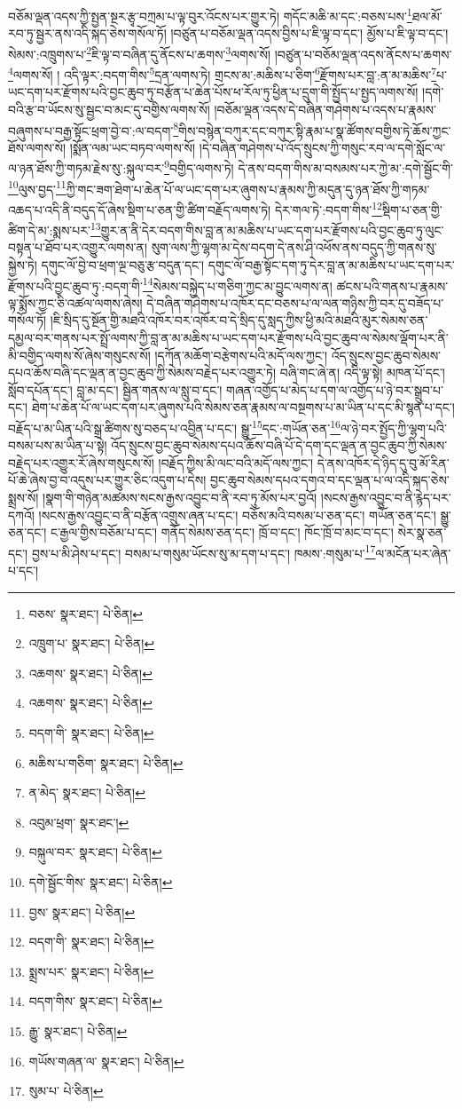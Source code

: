 བཅོམ་ལྡན་འདས་ཀྱི་སྤྱན་སྔར་རྩྭ་བཀྲམ་པ་ལྟ་བུར་འོངས་པར་གྱུར་ཏེ། གདོང་མཆི་མ་དང་:བཅས་པས་\footnote{བཅས་  སྣར་ཐང་།  པེ་ཅིན། }ཐལ་མོ་རབ་ཏུ་སྦྱར་ནས་འདི་སྐད་ཅེས་གསོལ་ཏོ། །བཙུན་པ་བཅོམ་ལྡན་འདས་བྱིས་པ་ཇི་ལྟ་བ་དང་། མྱོས་པ་ཇི་ལྟ་བ་དང་། སེམས་:འཁྲུགས་པ་\footnote{འཁྲུག་པ་  སྣར་ཐང་།  པེ་ཅིན། }ཇི་ལྟ་བ་བཞིན་དུ་ནོངས་པ་ཆགས་\footnote{འཆགས་  སྣར་ཐང་།  པེ་ཅིན། }ལགས་སོ། །བཙུན་པ་བཅོམ་ལྡན་འདས་ནོངས་པ་ཆགས་\footnote{འཆགས་  སྣར་ཐང་།  པེ་ཅིན། }ལགས་སོ། །
འདི་ལྟར་:བདག་གིས་\footnote{བདག་གི་  སྣར་ཐང་།  པེ་ཅིན། }དྲན་ལགས་ཏེ། གྲངས་མ་:མཆིས་པ་ཅིག་\footnote{མཆིས་པ་གཅིག་  སྣར་ཐང་།  པེ་ཅིན། }རྫོགས་པར་བླ་:ན་མ་མཆིས་\footnote{ན་མེད་  སྣར་ཐང་།  པེ་ཅིན། }པ་ཡང་དག་པར་རྫོགས་པའི་བྱང་ཆུབ་ཏུ་བརྩོན་པ་ཆེན་པོས་ཕ་རོལ་ཏུ་ཕྱིན་པ་དྲུག་གི་སྤྱོད་པ་སྤྱད་ལགས་སོ། །དགེ་བའི་རྩ་བ་ཡོངས་སུ་སྦྱང་བ་མང་དུ་བགྱིས་ལགས་སོ། །བཅོམ་ལྡན་འདས་དེ་བཞིན་གཤེགས་པ་འདས་པ་རྣམས་བཞུགས་པ་བརྒྱ་སྟོང་ཕྲག་བྱེ་བ་:ལ་བདག་\footnote{འབུམ་ཕྲག་  སྣར་ཐང་། }གིས་བསྙེན་བཀུར་དང་བཀུར་སྟི་རྣམ་པ་སྣ་ཚོགས་བགྱིས་ཏེ་ཆོས་ཀྱང་ཐོས་ལགས་སོ། །སྨོན་ལམ་ཡང་བཏབ་ལགས་སོ། །དེ་བཞིན་གཤེགས་པ་འོད་སྲུངས་ཀྱི་གསུང་རབ་ལ་དགེ་སློང་ལ་ལ་ཉན་ཐོས་ཀྱི་གཏམ་རྗེས་སུ་:སྐུལ་བར་\footnote{བསྐུལ་བར་  སྣར་ཐང་།  པེ་ཅིན། }བགྱིད་ལགས་ཏེ། དེ་ནས་བདག་གིས་མ་བསམས་པར་ཀྱེ་མ་:དགེ་སྦྱོང་གི་\footnote{དགེ་སྦྱོང་གིས་  སྣར་ཐང་།  པེ་ཅིན། }ལུས་བྱད་\footnote{བྱས་  སྣར་ཐང་།  པེ་ཅིན། }ཀྱི་གང་ཟག་ཐེག་པ་ཆེན་པོ་ལ་ཡང་དག་པར་ཞུགས་པ་རྣམས་ཀྱི་མདུན་དུ་ཉན་ཐོས་ཀྱི་གཏམ་འཆད་པ་འདི་ནི་བདུད་དོ་ཞེས་སྡིག་པ་ཅན་གྱི་ཚིག་བརྗོད་ལགས་ཏེ། དེར་གལ་ཏེ་:བདག་གིས་\footnote{བདག་གི་  སྣར་ཐང་།  པེ་ཅིན། }སྡིག་པ་ཅན་གྱི་ཚིག་དེ་མ་:སྨས་པར་\footnote{སྨྲས་པར་  སྣར་ཐང་།  པེ་ཅིན། }གྱུར་ན་ནི་དེར་བདག་གིས་བླ་ན་མ་མཆིས་པ་ཡང་དག་པར་རྫོགས་པའི་བྱང་ཆུབ་ཏུ་ལུང་བསྟན་པ་ཐོབ་པར་འགྱུར་ལགས་ན། སུག་ལས་ཀྱི་ལྷག་མ་དེས་བདག་དེ་ནས་ཤི་འཕོས་ནས་བདུད་ཀྱི་གནས་སུ་སྐྱེས་ཏེ། དགུང་ལོ་བྱེ་བ་ཕྲག་ལྔ་བཅུ་རྩ་བདུན་དང་། དགུང་ལོ་བརྒྱ་སྟོང་དག་ཏུ་དེར་བླ་ན་མ་མཆིས་པ་ཡང་དག་པར་རྫོགས་པའི་བྱང་ཆུབ་ཏུ་:བདག་གི་\footnote{བདག་གིས་  སྣར་ཐང་།  པེ་ཅིན། }སེམས་བསྐྱེད་པ་གཅིག་ཀྱང་མ་བྱུང་ལགས་ན། ཚངས་པའི་གནས་པ་རྣམས་ལྟ་སྨོས་ཀྱང་ཅི་འཚལ་ལགས་ཞེས། དེ་བཞིན་གཤེགས་པ་འཁོར་དང་བཅས་པ་ལ་ལན་གཉིས་ཀྱི་བར་དུ་བཟོད་པ་གསོལ་ཏོ། །ཇི་སྲིད་དུ་སྔོན་གྱི་མཐའི་འཁོར་བར་འཁོར་བ་དེ་སྲིད་དུ་སླད་ཀྱིས་ཕྱི་མའི་མཐའི་མུར་སེམས་ཅན་དམྱལ་བར་གནས་པར་སྤྲོ་ལགས་ཀྱི་བླ་ན་མ་མཆིས་པ་ཡང་དག་པར་རྫོགས་པའི་བྱང་ཆུབ་ལ་སེམས་ལྡོག་པར་ནི་མི་བགྱིད་ལགས་སོ་ཞེས་གསུངས་སོ། །དཀོན་མཆོག་བརྩེགས་པའི་མདོ་ལས་ཀྱང་། འོད་སྲུངས་བྱང་ཆུབ་སེམས་དཔའ་ཆོས་བཞི་དང་ལྡན་ན་བྱང་ཆུབ་ཀྱི་སེམས་བརྗེད་པར་འགྱུར་ཏེ། བཞི་གང་ཞེ་ན། འདི་ལྟ་སྟེ། མཁན་པོ་དང་། སློབ་དཔོན་དང་། བླ་མ་དང་། སྦྱིན་གནས་ལ་སླུ་བ་དང་། གཞན་འགྱོད་པ་མེད་པ་དག་ལ་འགྱོད་པ་ཉེ་བར་སྒྲུབ་པ་དང་། ཐེག་པ་ཆེན་པོ་ལ་ཡང་དག་པར་ཞུགས་པའི་སེམས་ཅན་རྣམས་ལ་བསྔགས་པ་མ་ཡིན་པ་དང་མི་སྙན་པ་དང་། བརྗོད་པ་མ་ཡིན་པའི་སྒྲ་ཚིགས་སུ་བཅད་པ་འབྱིན་པ་དང་། སྒྱུ་\footnote{རྒྱུ་  སྣར་ཐང་།  པེ་ཅིན། }དང་:གཡོན་ཅན་\footnote{གཡོས་གཞན་ལ་  སྣར་ཐང་།  པེ་ཅིན། }ལ་ཉེ་བར་སྤྱོད་ཀྱི་ལྷག་པའི་བསམ་པས་མ་ཡིན་པ་སྟེ། འོད་སྲུངས་བྱང་ཆུབ་སེམས་དཔའ་ཆོས་བཞི་པོ་དེ་དག་དང་ལྡན་ན་བྱང་ཆུབ་ཀྱི་སེམས་བརྗེད་པར་འགྱུར་རོ་ཞེས་གསུངས་སོ། །བརྗོད་ཀྱིས་མི་ལང་བའི་མདོ་ལས་ཀྱང་། དེ་ནས་འཁོར་དེ་ཉིད་དུ་བུ་མོ་རིན་པོ་ཆེ་ཞེས་བྱ་བ་འདུས་པར་གྱུར་ཅིང་འདུག་པ་དེས། བྱང་ཆུབ་སེམས་དཔའ་དགའ་བ་དང་ལྡན་པ་ལ་འདི་སྐད་ཅེས་སྨྲས་སོ། །སྣག་གི་གཉེན་མཚམས་སངས་རྒྱས་འབྱུང་བ་ནི་རབ་ཏུ་མོས་པར་བྱའོ། །སངས་རྒྱས་འབྱུང་བ་ནི་རྙེད་པར་དཀའོ། །སངས་རྒྱས་འབྱུང་བ་ནི་བརྩོན་འགྲུས་ཞན་པ་དང་། བཅོས་མའི་བསམ་པ་ཅན་དང་། གཡོན་ཅན་དང་། སྒྱུ་ཅན་དང་། ང་རྒྱལ་གྱིས་བཅོམ་པ་དང་། གནོད་སེམས་ཅན་དང་། ཁྲོ་བ་དང་། ཁོང་ཁྲོ་བ་མང་བ་དང་། སེར་སྣ་ཅན་དང་། བྱས་པ་མི་ཤེས་པ་དང་། བསམ་པ་གསུམ་ཡོངས་སུ་མ་དག་པ་དང་། ཁམས་:གསུམ་པ་\footnote{སུམ་པ་  པེ་ཅིན། }ལ་མངོན་པར་ཞེན་པ་དང་། 